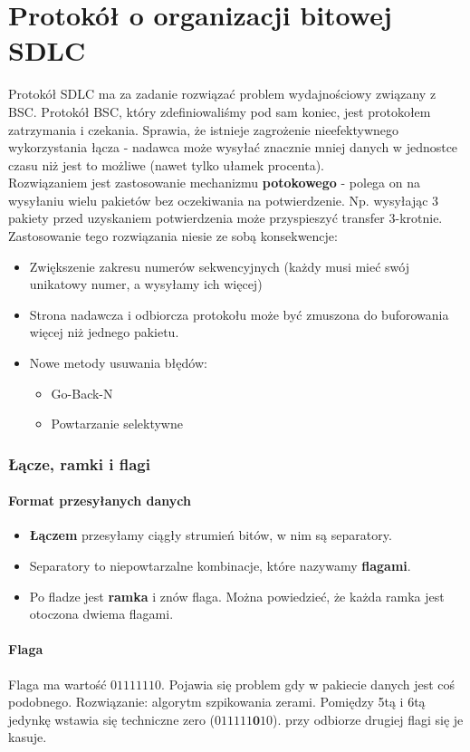 \documentclass[a4paper,twoside]{article}
\begin{document}
\part{Protokół o organizacji bitowej SDLC}
Protokół SDLC ma za zadanie rozwiązać problem wydajnościowy związany z BSC. Protokół BSC, który zdefiniowaliśmy pod sam koniec, jest protokołem zatrzymania i czekania. Sprawia, że istnieje zagrożenie nieefektywnego wykorzystania łącza - nadawca może wysyłać znacznie mniej danych w jednostce czasu niż jest to możliwe (nawet tylko ułamek procenta).\\
Rozwiązaniem jest zastosowanie mechanizmu \textbf{potokowego} - polega on na wysyłaniu wielu pakietów bez oczekiwania na potwierdzenie. Np. wysyłając 3 pakiety przed uzyskaniem potwierdzenia może przyspieszyć transfer 3-krotnie.\\
Zastosowanie tego rozwiązania niesie ze sobą konsekwencje:
\begin{itemize}
	\item Zwiększenie zakresu numerów sekwencyjnych (każdy musi mieć swój unikatowy numer, a wysyłamy ich więcej)
	\item Strona nadawcza i odbiorcza protokołu może być zmuszona do buforowania więcej niż jednego pakietu.
	\item Nowe metody usuwania błędów:
	\begin{itemize}
		\item Go-Back-N
		\item Powtarzanie selektywne
	\end{itemize}
\end{itemize}
\section{Łącze, ramki i flagi}
\subsection{Format przesyłanych danych}
\begin{itemize}
	\item \textbf{Łączem} przesyłamy ciągły strumień bitów, w nim są separatory.
	\item Separatory to niepowtarzalne kombinacje, które nazywamy \textbf{flagami}.
	\item Po fladze jest \textbf{ramka} i znów flaga. Można powiedzieć, że każda ramka jest otoczona dwiema flagami.
\end{itemize}
\subsection{Flaga}
Flaga ma wartość $ 01111110 $. Pojawia się problem gdy w pakiecie danych jest coś podobnego. Rozwiązanie: algorytm szpikowania zerami. Pomiędzy 5tą i 6tą jedynkę wstawia się techniczne zero ($ 011111\textbf{0}10 $). przy odbiorze drugiej flagi się je kasuje.
\end{document}
